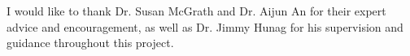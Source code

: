 

\begin{acknowledgements}

I would like to thank Dr. Susan McGrath and Dr. Aijun An for their expert advice and encouragement, as well as Dr. Jimmy Hunag for his supervision and guidance throughout this project.

\end{acknowledgements}